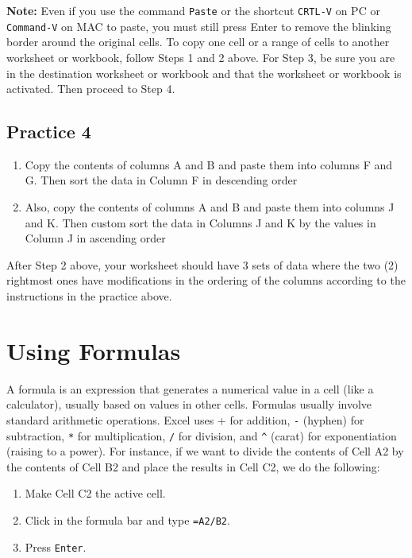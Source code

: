 \documentclass[
]{book}
\providecommand{\tightlist}{%
  \setlength{\itemsep}{0pt}\setlength{\parskip}{0pt}}
\begin{document}
\textbf{Note:} Even if you use the command \texttt{Paste} or the shortcut \texttt{CRTL-V} on PC or \texttt{Command-V} on MAC to paste, you must still press Enter to remove the blinking border around the original cells. To copy one cell or a range of cells to another worksheet or workbook, follow Steps 1 and 2 above. For Step
3, be sure you are in the destination worksheet or workbook and that the worksheet or workbook is activated. Then proceed to Step 4.

\hypertarget{practice-4}{%
\subsection{Practice 4}\label{practice-4}}

\begin{enumerate}
\def\labelenumi{\arabic{enumi}.}
\tightlist
\item
  Copy the contents of columns A and B and paste them into columns F and G. Then sort the data in Column F in descending order
\item
  Also, copy the contents of columns A and B and paste them into columns J and K. Then custom sort the data in Columns J and K by the values in Column J in ascending order
\end{enumerate}

After Step 2 above, your worksheet should have 3 sets of data where the two (2) rightmost ones have modifications in the ordering of the columns according to the instructions in the practice above.

\hypertarget{using-formulas}{%
\section{Using Formulas}\label{using-formulas}}

A formula is an expression that generates a numerical value in a cell (like a calculator), usually based on values in other cells.
Formulas usually involve standard arithmetic operations. Excel uses + for addition, \texttt{-} (hyphen) for subtraction, \texttt{*} for multiplication, \texttt{/} for division, and \texttt{\^{}} (carat) for exponentiation (raising to a power). For instance, if we want to divide the contents of Cell A2 by the contents of Cell B2 and place the results in Cell C2, we do the following:

\begin{enumerate}
\def\labelenumi{\arabic{enumi}.}
\tightlist
\item
  Make Cell C2 the active cell.
\item
  Click in the formula bar and type \texttt{=A2/B2}.
\item
  Press \texttt{Enter}.
\end{enumerate}
\end{document}

